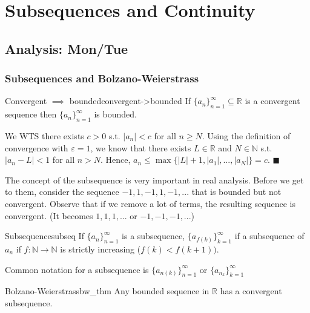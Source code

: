\documentclass[11pt, letterpaper, openany]{book}
\renewenvironment{proof}[1][\proofname]{%
  \tcolorbox[blanker, breakable, left=1em,
    before skip=1em, after skip=1em,
    borderline west={2pt}{0pt}{MagicTeal!50},
    colback=MagicCream,
    before upper={\textcolor{MagicTeal}{\sffamily\bfseries #1.}\space}
  ]%
}{%
  \hfill\textcolor{MagicTeal}{\ensuremath{\blacksquare}}\endtcolorbox%
}
\begin{document}
\chapter{Subsequences and Continuity}

\section{Analysis: Mon/Tue}

\subsection{Subsequences and Bolzano-Weierstrass}

\begin{thm}{Convergent $\implies$ bounded}{convergent->bounded}
    If $\{a_n\}_{n=1}^\infty\subseteq\mathbb{R}$ is a convergent sequence then $\{a_n\}_{n=1}^\infty$ is bounded. 
\end{thm}
\begin{proof}
    We WTS there exists $c>0$ s.t. $|a_n|<c$ for all $n\geq{N}$. Using the definition of convergence with $\varepsilon=1$, we know that there exists $L\in\mathbb{R}$ and $N\in{\mathbb{N}}$ s.t. $|a_n-L|<1$ for all $n>N$. Hence, $a_n\leq\max\{|L|+1,|a_1|,...,|a_N|\}=c$. 
\end{proof}
\begin{remark}
    The concept of the subsequence is very important in real analysis. Before we get to them, consider the sequence $-1,1,-1,1,-1,...$ that is bounded but not convergent. Observe that if we remove a lot of terms, the resulting sequence is convergent. (It becomes $1,1,1,...$ or $-1,-1,-1,...$)
\end{remark}


\begin{defn}{Subsequence}{subseq}
If $\{a_n\}^\infty_{n=1}$ is a subsequence, $\{a_{f(k)}\}^\infty_{k=1}$ if a subsequence of $a_n$ if $f:\mathbb{N}\to\mathbb{N}$ is strictly increasing ($f(k)<f(k+1))$. 
\end{defn}
\begin{remark}
    Common notation for a subsequence is $\{a_{n(k)}\}^\infty_{n=1}$ or $\{a_{n_k}\}_{k=1}^\infty$
\end{remark}

\begin{thm}{Bolzano-Weierstrass}{bw_thm}
Any bounded sequence in $\mathbb{R}$ has a convergent subsequence.
\end{thm}
\end{document}
